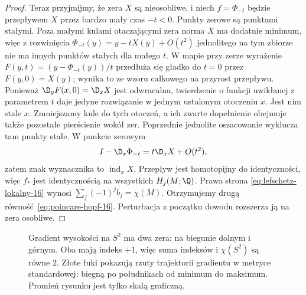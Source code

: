 \begin{proof}
Teraz przyjmijmy, że
zera $X$ są nieosobliwe,
i niech $f=\Phi_{-t}$
będzie przepływem
$X$ przez bardzo
mały czas $-t<0$.
Punkty zerowe są
punktami stałymi.
Poza małymi kulami
otaczającymi zera
norma $X$ ma
dodatnie minimum,
więc z rozwinięcia
$\Phi_{-t}(y)=y-tX(y)+O(t^2)$
jednolitego na tym
zbiorze nie ma
innych punktów
stałych dla małego $t$.
W mapie przy zerze wyrażenie
$F(y,t)=(y-\Phi_{-t}(y))/t$ przedłuża się gładko
do $t=0$ przez $F(y,0)=X(y)$; wynika to ze wzoru
całkowego na przyrost przepływu. Ponieważ
$\D_yF(x,0)=\D_xX$ jest odwracalna, twierdzenie
o funkcji uwikłanej z parametrem $t$ daje jedyne
rozwiązanie w jednym ustalonym otoczeniu $x$.
Jest nim stale $x$. Zmniejszamy kule do tych
otoczeń, a ich zwarte dopełnienie obejmuje także
pozostałe pierścienie wokół zer. Poprzednie
jednolite oszacowanie wyklucza tam punkty stałe.
W punkcie zerowym
\[
 I-\D_x\Phi_{-t}
   =t\D_xX+O(t^2),
\]
zatem znak wyznacznika
to $\operatorname{ind}_xX$.
Przepływ jest
homotopijny do
identyczności,
więc $f_*$ jest
identycznością
na wszystkich
$H_j(M;\Q)$.
Prawa strona
\eqref{eq:lefschetz-lokalny-16}
wynosi
$\sum_j(-1)^j b_j=\chi(M)$.
Otrzymujemy drugą
równość~\eqref{eq:poincare-hopf-16}.
Perturbacja z początku
dowodu rozszerza ją
na zera osobliwe.
\end{proof}

\begin{figure}[htbp]
\centering
{}
\caption{Gradient wysokości na $S^2$
ma dwa zera: na biegunie dolnym
i górnym. Oba mają indeks $+1$,
więc suma indeksów i $\chi(S^2)$ są równe $2$.
Złote łuki pokazują rzuty trajektorii gradientu
w metryce standardowej: biegną po południkach od minimum
do maksimum. Promień rysunku jest tylko skalą graficzną.}
\label{fig:poincare-hopf-16}
\end{figure}

